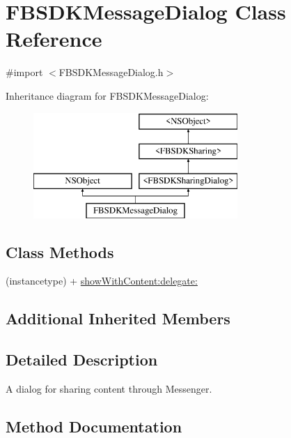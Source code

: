 \hypertarget{interface_f_b_s_d_k_message_dialog}{}\section{F\+B\+S\+D\+K\+Message\+Dialog Class Reference}
\label{interface_f_b_s_d_k_message_dialog}


{\ttfamily \#import $<$F\+B\+S\+D\+K\+Message\+Dialog.\+h$>$}

Inheritance diagram for F\+B\+S\+D\+K\+Message\+Dialog\+:\begin{figure}[H]
\begin{center}
\leavevmode
\includegraphics[height=4.000000cm]{interface_f_b_s_d_k_message_dialog}
\end{center}
\end{figure}
\subsection*{Class Methods}
\begin{DoxyCompactItemize}
\item 
(instancetype) + \hyperlink{interface_f_b_s_d_k_message_dialog_aef7d0cbccecedeb9102ad6b08f9a5407}{show\+With\+Content\+:delegate\+:}
\end{DoxyCompactItemize}
\subsection*{Additional Inherited Members}


\subsection{Detailed Description}
A dialog for sharing content through Messenger. 

\subsection{Method Documentation}
\hypertarget{interface_f_b_s_d_k_message_dialog_aef7d0cbccecedeb9102ad6b08f9a5407}{}

